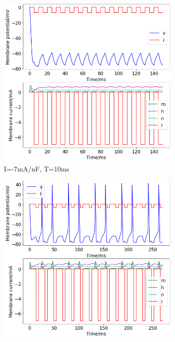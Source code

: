 \documentclass[twoside,twocolumn]{article}
\begin{document}
\begin{figure}[h]
  \centering
  \begin{subfigure}[t]{0.49\textwidth}
    \includegraphics[width=\linewidth]{n7-10}
  \caption{I=-7mA/nF, T=10ms}
  \label{sub:2d7-10}
  \end{subfigure}
  \begin{subfigure}[t]{0.49\textwidth}
    \includegraphics[width=\linewidth]{n7-18}

\end{subfigure}
\end{figure}
\end{document}
